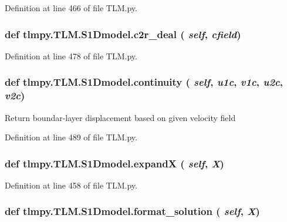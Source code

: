 Definition at line 466 of file TLM.py.\hypertarget{classtlmpy_1_1TLM_1_1S1Dmodel_a85ff9f8276cb643877c448ff47cbcbfd}{
\subsubsection[{c2r\_\-deal}]{\setlength{\rightskip}{0pt plus 5cm}def tlmpy.TLM.S1Dmodel.c2r\_\-deal ( {\em self}, \/   {\em cfield})}}
\label{classtlmpy_1_1TLM_1_1S1Dmodel_a85ff9f8276cb643877c448ff47cbcbfd}


Definition at line 478 of file TLM.py.\hypertarget{classtlmpy_1_1TLM_1_1S1Dmodel_a9ff80ef180ad7c4b3f1f1dd7b62e2afb}{
\subsubsection[{continuity}]{\setlength{\rightskip}{0pt plus 5cm}def tlmpy.TLM.S1Dmodel.continuity ( {\em self}, \/   {\em u1c}, \/   {\em v1c}, \/   {\em u2c}, \/   {\em v2c})}}
\label{classtlmpy_1_1TLM_1_1S1Dmodel_a9ff80ef180ad7c4b3f1f1dd7b62e2afb}
\begin{DoxyVerb}Return boundar-layer displacement based on given velocity field\end{DoxyVerb}
 

Definition at line 489 of file TLM.py.\hypertarget{classtlmpy_1_1TLM_1_1S1Dmodel_a0b636a50ced82756766cc745354d451a}{
\subsubsection[{expandX}]{\setlength{\rightskip}{0pt plus 5cm}def tlmpy.TLM.S1Dmodel.expandX ( {\em self}, \/   {\em X})}}
\label{classtlmpy_1_1TLM_1_1S1Dmodel_a0b636a50ced82756766cc745354d451a}


Definition at line 458 of file TLM.py.\hypertarget{classtlmpy_1_1TLM_1_1S1Dmodel_ae393b541f64b000c9fc0fd127fd42922}{
\subsubsection[{format\_\-solution}]{\setlength{\rightskip}{0pt plus 5cm}def tlmpy.TLM.S1Dmodel.format\_\-solution ( {\em self}, \/   {\em X})}}
\label{classtlmpy_1_1TLM_1_1S1Dmodel_ae393b541f64b000c9fc0fd127fd42922}


